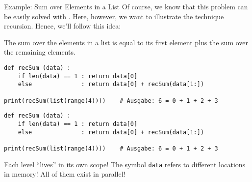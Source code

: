 
\begin{frame}[fragile]{Example: Sum over Elements in a List}
%
Of course, we know that this problem can be easily solved with . Here, however, we want to illustrate the technique recursion. Hence, we'll follow this idea:
%
\vspace{6pt}
\begin{tcolorbox}[title=Recursive Approach]
The sum over the elements in a list is equal to its first element plus the sum over the remaining elements.
\end{tcolorbox}
%
\begin{codebox}
\begin{verbatim}
def recSum (data) :
    if len(data) == 1 : return data[0]
    else              : return data[0] + recSum(data[1:])
    
print(recSum(list(range(4))))    # Ausgabe: 6 = 0 + 1 + 2 + 3
\end{verbatim}
\end{codebox}
%
\end{frame}


\begin{frame}[fragile]
%
\begin{codebox}
\begin{verbatim}
def recSum (data) :
    if len(data) == 1 : return data[0]
    else              : return data[0] + recSum(data[1:])
    
print(recSum(list(range(4))))    # Ausgabe: 6 = 0 + 1 + 2 + 3
\end{verbatim}
\end{codebox}
%
\begin{codebox}[Call (line 5) sends to level 0, width=.7\linewidth, nobeforeafter, equal height group = B]
\scriptsize{}
	\begin{codebox}
	\scriptsize{}
		\begin{codebox}
		\scriptsize{}		
		\end{codebox}
	\end{codebox}
\end{codebox}
%
\begin{hintbox}[Regard, width=.29\linewidth, nobeforeafter, equal height group = B]
Each level \enquote{lives} in its own scope! The symbol \texttt{data} refers to different locations in memory! All of them exist in parallel!
\end{hintbox}
%
\end{frame}

